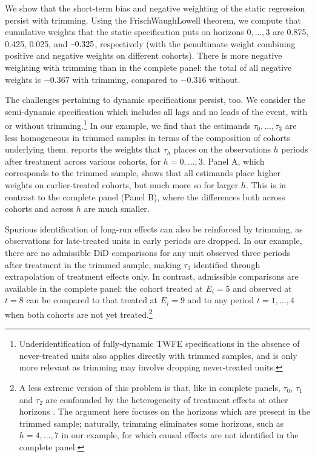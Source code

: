 \documentclass[english,11pt]{article}
\makeatletter
\newcommand{\lyxmathsym}[1]{\ifmmode\begingroup\def\b@ld{bold}
  \text{\ifx\math@version\b@ld\bfseries\fi#1}\endgroup\else#1\fi}
\theoremstyle{plain}
\theoremstyle{plain}
\theoremstyle{plain}
\theoremstyle{plain}
\let\ref\Cref
\makeatother
\begin{document}
We show that the short-term bias and negative weighting of the static
regression persist with trimming. Using the Frisch\textendash Waugh\textendash Lowell
theorem, we compute that cumulative weights that the static specification
puts on horizons $0,\dots,3$ are 0.875, 0.425, 0.025, and $\lyxmathsym{\textendash}0.325$,
respectively (with the penultimate weight combining positive and negative
weights on different cohorts). There is more\emph{ }negative weighting
with trimming than in the complete panel: the total of all negative
weights is $-0.367$ with trimming, compared to $-0.316$ without.

The challenges pertaining to dynamic specifications persist, too.
We consider the semi-dynamic specification which includes all lags
and no leads of the event, with or without trimming.\footnote{Underidentification of fully-dynamic TWFE specifications in the absence
of never-treated units also applies directly with trimmed samples,
and is only more relevant as trimming may involve dropping never-treated
units.} In our example, we find that the estimands $\tau_{0},\dots,\tau_{3}$
are less homogeneous in trimmed samples in terms of the composition
of cohorts underlying them. \ref{fig:Trimming} reports the weights
that $\tau_{h}$ places on the observations $h$ periods after treatment
across various cohorts, for $h=0,\dots,3$. Panel A, which corresponds
to the trimmed sample, shows that all estimands place higher weights
on earlier-treated cohorts, but much more so for larger $h$. This
is in contrast to the complete panel (Panel B), where the differences
both across cohorts and across $h$ are much smaller.

Spurious identification of long-run effects can also be reinforced
by trimming, as observations for late-treated units in early periods
are dropped. In our example, there are no admissible DiD comparisons
for any unit observed three periods after treatment in the trimmed
sample, making $\tau_{3}$ identified through extrapolation of treatment
effects only. In contrast, admissible comparisons are available in
the complete panel: the cohort treated at $E_{i}=5$ and observed
at $t=8$ can be compared to that treated at $E_{i}=9$ and to any
period $t=1,\dots,4$ when both cohorts are not yet treated.\footnote{A less extreme version of this problem is that, like in complete panels,
$\tau_{0}$, $\tau_{1}$ and $\tau_{2}$ are confounded by the heterogeneity
of treatment effects at other horizons \parencite{Abraham2018}. The
argument here focuses on the horizons which are present in the trimmed
sample; naturally, trimming eliminates some horizons, such as $h=4,\dots,7$
in our example, for which causal effects are not identified in the
complete panel.}
\end{document}

